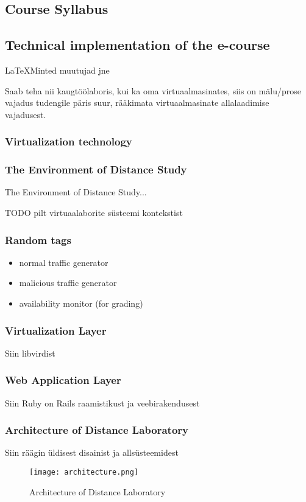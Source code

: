 \subsection{Course Syllabus}
\label{Course Syllabus}

\subsection{Technical implementation of the e-course}

\LaTeX Minted muutujad jne


Saab teha nii kaugtöölaboris, kui ka oma virtuaalmasinates, siis on mälu/prose vajadus tudengile päris suur, rääkimata virtuaalmasinate allalaadimise vajadusest.

\subsubsection{Virtualization technology}

\subsubsection{The Environment of Distance Study}
\label{The Environment of Distance Study}
The Environment of Distance Study...

TODO pilt virtuaalaborite süsteemi kontekstist
\subsubsection{Random tags}
\begin{itemize}
	\item normal traffic generator
	\item malicious traffic generator
	\item availability monitor (for grading)
\end{itemize}

\subsubsection{Virtualization Layer}
Siin libvirdist
\subsubsection{Web Application Layer}
Siin Ruby on Rails raamistikust ja veebirakendusest
\subsubsection{Architecture of Distance Laboratory}
Siin räägin üldisest disainist ja allsüsteemidest
\
\begin{figure}[ht]
\centering
\texttt{[image: architecture.png]}
\caption{Architecture of Distance Laboratory}
\label{fig:Architecture of Distance Laboratory}
\end{figure}
\

